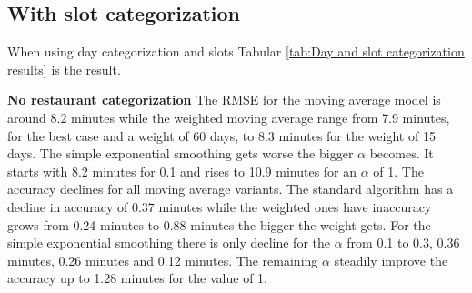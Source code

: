 \subsection{With slot categorization}
When using day categorization and slots Tabular \ref{tab:Day and slot categorization results} is the result.
\begin{table}[h]
\centering
\caption{Day categorization with slot}
\label{tab:Day and slot categorization results}
\end{table}
\newline\newline\textbf{No restaurant categorization}\newline
The RMSE for the moving average model is around 8.2 minutes while the weighted moving average range from 7.9 minutes, for the best case and a weight of 60 days, to 8.3 minutes for the weight of 15 days. The simple exponential smoothing gets worse the bigger $\alpha$ becomes. It starts with 8.2 minutes for 0.1 and rises to 10.9 minutes for an $\alpha$ of 1. The accuracy declines for all moving average variants. The standard algorithm has a decline in accuracy of 0.37 minutes while the weighted ones have inaccuracy grows from 0.24 minutes to 0.88 minutes the bigger the weight gets. For the simple exponential smoothing there is only decline for the $\alpha$ from 0.1 to 0.3, 0.36 minutes, 0.26 minutes and 0.12 minutes. The remaining $\alpha$ steadily improve the accuracy up to 1.28 minutes for the value of 1.\newline

